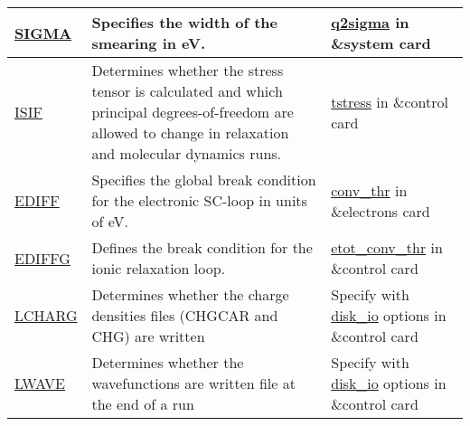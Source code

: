 \documentclass[12pt]{article}
\begin{document}
\begin{center}
\begin{table}[ht]
\begin{tabularx}{\linewidth}{|>{\RaggedRight}p{2.5cm}|x|x|}
 \href{https://www.vasp.at/wiki/index.php/SIGMA}{SIGMA} &
 Specifies the width of the smearing in eV. &
 \href{https://www.quantum-espresso.org/Doc/INPUT_PW.html#idm406}{q2sigma} in \&system card \\ \hline
 
 \href{https://www.vasp.at/wiki/index.php/ISIF}{ISIF} &
 Determines whether the stress tensor is calculated and which principal degrees-of-freedom are allowed to change in relaxation and molecular dynamics runs. &
 \href{https://www.quantum-espresso.org/Doc/INPUT_PW.html#idm735}{tstress} in \&control card \\ \hline
 
 \href{https://www.vasp.at/wiki/index.php/EDIFF}{EDIFF} &
 Specifies the global break condition for the electronic SC-loop in units of eV. &
 \href{https://www.quantum-espresso.org/Doc/INPUT_PW.html#idm771}{conv\_thr} in \&electrons card \\ \hline
 
 \href{https://www.vasp.at/wiki/index.php/EDIFFG}{EDIFFG} &
  Defines the break condition for the ionic relaxation loop. &
 \href{https://www.quantum-espresso.org/Doc/INPUT_PW.html#idm117}{etot\_conv\_thr} in \&control card \\ \hline
 
 \href{https://www.vasp.at/wiki/index.php/LCHARG}{LCHARG} &
 Determines whether the charge densities files (CHGCAR and CHG) are written &
 Specify with \href{https://www.quantum-espresso.org/Doc/INPUT_PW.html#idm1487}{disk\_io} options in \&control card \\ \hline
 
 \href{template.url}{LWAVE} &
 Determines whether the wavefunctions are written file at the end of a run &
 Specify with \href{https://www.quantum-espresso.org/Doc/INPUT_PW.html#idm1487}{disk\_io} options in \&control card \\ \hline
\end{tabularx}
\end{table}
\end{center}
\end{document}
